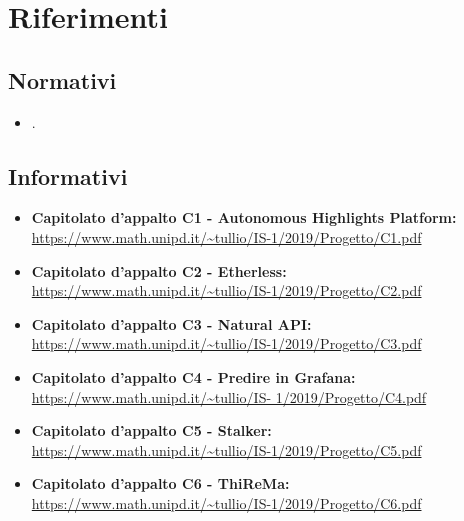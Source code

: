 \section{Riferimenti}

\subsection{Normativi}
\begin{itemize}
\item {}.
\end{itemize}

\subsection{Informativi}

\begin{itemize}
\item \textbf {Capitolato d'appalto C1 - Autonomous Highlights Platform:}\\
\url{https://www.math.unipd.it/~tullio/IS-1/2019/Progetto/C1.pdf}
\item \textbf {Capitolato d'appalto C2 - Etherless:}\\
\url{https://www.math.unipd.it/~tullio/IS-1/2019/Progetto/C2.pdf}
\item \textbf {Capitolato d'appalto C3 - Natural API:}\\
\url{https://www.math.unipd.it/~tullio/IS-1/2019/Progetto/C3.pdf}
\item \textbf {Capitolato d'appalto C4 - Predire in Grafana:}\\
\url{https://www.math.unipd.it/~tullio/IS- 1/2019/Progetto/C4.pdf}
\item \textbf {Capitolato d'appalto C5 - Stalker:}\\
\url{https://www.math.unipd.it/~tullio/IS-1/2019/Progetto/C5.pdf}
\item \textbf {Capitolato d'appalto C6 - ThiReMa:}\\
\url{https://www.math.unipd.it/~tullio/IS-1/2019/Progetto/C6.pdf}

\end{itemize}
